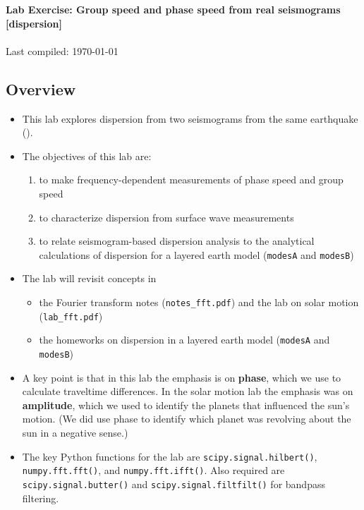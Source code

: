 \documentclass[11pt,titlepage,fleqn]{article}
\begin{document}

\begin{spacing}{1.2}
\centering
{\large \bf Lab Exercise: Group speed and phase speed from real seismograms [dispersion]} \\
\cltag\ \\
Last compiled: \today \\
\end{spacing}


\subsection*{Overview}

\begin{itemize}
\item This lab explores dispersion from two seismograms from the same earthquake ().

\item The objectives of this lab are:
%
\begin{enumerate}
\item to make frequency-dependent measurements of phase speed and group speed
\item to characterize dispersion from surface wave measurements
\item to relate seismogram-based dispersion analysis to the analytical calculations of dispersion for a layered earth model (\verb+modesA+ and \verb+modesB+)
\end{enumerate}

\item The lab will revisit concepts in
%
\begin{itemize}
\item the Fourier transform notes (\verb+notes_fft.pdf+) and the lab on solar motion (\verb+lab_fft.pdf+)
\item the homeworks on dispersion in a layered earth model (\verb+modesA+ and \verb+modesB+)
\end{itemize}

\item A key point is that in this lab the emphasis is on {\bf phase}, which we use to calculate traveltime differences. In the solar motion lab the emphasis was on {\bf amplitude}, which we used to identify the planets that influenced the sun's motion. (We did use phase to identify which planet was revolving about the sun in a negative sense.)

\item The key Python functions for the lab are \verb+scipy.signal.hilbert()+, \verb+numpy.fft.fft()+, and \verb+numpy.fft.ifft()+. Also required are \verb+scipy.signal.butter()+ and \verb+scipy.signal.filtfilt()+ for bandpass filtering.

\end{itemize}
\end{document}
